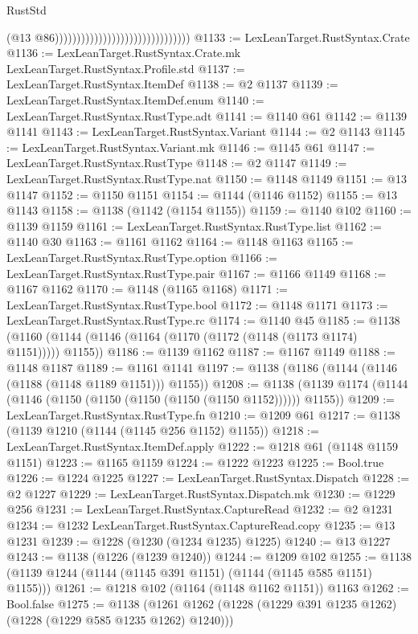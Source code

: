 \begin{lexlean}{RustStd}
\begin{coremodule}
                                                                (@13
                                                                  @86)))))))))))))))))))))))))))))))
@1133 := LexLeanTarget.RustSyntax.Crate
@1136 := LexLeanTarget.RustSyntax.Crate.mk LexLeanTarget.RustSyntax.Profile.std
@1137 := LexLeanTarget.RustSyntax.ItemDef
@1138 := @2 @1137
@1139 := LexLeanTarget.RustSyntax.ItemDef.enum
@1140 := LexLeanTarget.RustSyntax.RustType.adt
@1141 := @1140 @61
@1142 := @1139 @1141
@1143 := LexLeanTarget.RustSyntax.Variant
@1144 := @2 @1143
@1145 := LexLeanTarget.RustSyntax.Variant.mk
@1146 := @1145 @61
@1147 := LexLeanTarget.RustSyntax.RustType
@1148 := @2 @1147
@1149 := LexLeanTarget.RustSyntax.RustType.nat
@1150 := @1148 @1149
@1151 := @13 @1147
@1152 := @1150 @1151
@1154 := @1144 (@1146 @1152)
@1155 := @13 @1143
@1158 := @1138 (@1142 (@1154 @1155))
@1159 := @1140 @102
@1160 := @1139 @1159
@1161 := LexLeanTarget.RustSyntax.RustType.list
@1162 := @1140 @30
@1163 := @1161 @1162
@1164 := @1148 @1163
@1165 := LexLeanTarget.RustSyntax.RustType.option
@1166 := LexLeanTarget.RustSyntax.RustType.pair
@1167 := @1166 @1149
@1168 := @1167 @1162
@1170 := @1148 (@1165 @1168)
@1171 := LexLeanTarget.RustSyntax.RustType.bool
@1172 := @1148 @1171
@1173 := LexLeanTarget.RustSyntax.RustType.rc
@1174 := @1140 @45
@1185 := @1138 (@1160 (@1144 (@1146 (@1164 (@1170 (@1172 (@1148 (@1173 @1174) @1151))))) @1155))
@1186 := @1139 @1162
@1187 := @1167 @1149
@1188 := @1148 @1187
@1189 := @1161 @1141
@1197 := @1138 (@1186 (@1144 (@1146 (@1188 (@1148 @1189 @1151))) @1155))
@1208 := @1138 (@1139 @1174 (@1144 (@1146 (@1150 (@1150 (@1150 (@1150 (@1150 @1152)))))) @1155))
@1209 := LexLeanTarget.RustSyntax.RustType.fn
@1210 := @1209 @61
@1217 := @1138 (@1139 @1210 (@1144 (@1145 @256 @1152) @1155))
@1218 := LexLeanTarget.RustSyntax.ItemDef.apply
@1222 := @1218 @61 (@1148 @1159 @1151)
@1223 := @1165 @1159
@1224 := @1222 @1223
@1225 := Bool.true
@1226 := @1224 @1225
@1227 := LexLeanTarget.RustSyntax.Dispatch
@1228 := @2 @1227
@1229 := LexLeanTarget.RustSyntax.Dispatch.mk
@1230 := @1229 @256
@1231 := LexLeanTarget.RustSyntax.CaptureRead
@1232 := @2 @1231
@1234 := @1232 LexLeanTarget.RustSyntax.CaptureRead.copy
@1235 := @13 @1231
@1239 := @1228 (@1230 (@1234 @1235) @1225)
@1240 := @13 @1227
@1243 := @1138 (@1226 (@1239 @1240))
@1244 := @1209 @102
@1255 := @1138 (@1139 @1244 (@1144 (@1145 @391 @1151) (@1144 (@1145 @585 @1151) @1155)))
@1261 := @1218 @102 (@1164 (@1148 @1162 @1151)) @1163
@1262 := Bool.false
@1275 := @1138 (@1261 @1262 (@1228 (@1229 @391 @1235 @1262) (@1228 (@1229 @585 @1235 @1262) @1240)))

\end{coremodule}
\end{lexlean}
